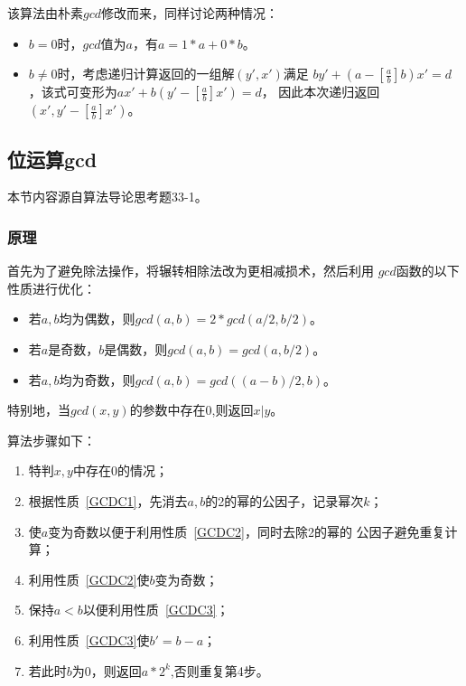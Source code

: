 该算法由朴素$gcd$修改而来，同样讨论两种情况：

\begin{itemize}
	\item $b=0$时，$gcd$值为$a$，有$a=1*a+0*b$。
	\item $b\neq 0$时，考虑递归计算返回的一组解$(y',x')$满足
	      $by'+(a-[\frac{a}{b}]b)x'=d$，该式可变形为$ax'+b(y'-[\frac{a}{b}]x')=d$，
	      因此本次递归返回$(x',y'-[\frac{a}{b}]x')$。
\end{itemize}

\subsection{位运算gcd}

本节内容源自算法导论\cite{ITA3}思考题33-1。

\subsubsection{原理}

首先为了避免除法操作，将辗转相除法改为更相减损术，然后利用
$gcd$函数的以下性质进行优化：

\begin{itemize}
	\item \begin{property}\label{GCDC1}
		      若$a,b$均为偶数，则$gcd(a,b)=2*gcd(a/2,b/2)$。
	      \end{property}
	\item \begin{property}\label{GCDC2}
		      若$a$是奇数，$b$是偶数，则$gcd(a,b)=gcd(a,b/2)$。
	      \end{property}
	\item \begin{property}\label{GCDC3}
		      若$a,b$均为奇数，则$gcd(a,b)=gcd((a-b)/2,b)$。
	      \end{property}
\end{itemize}

特别地，当$gcd(x,y)$的参数中存在0,则返回$x|y$。

算法步骤如下：
\begin{enumerate}
	\item 特判$x,y$中存在0的情况；
	\item 根据性质~\ref{GCDC1}，先消去$a,b$的2的幂的公因子，记录幂次$k$；
	\item 使$a$变为奇数以便于利用性质~\ref{GCDC2}，同时去除2的幂的
	      公因子避免重复计算；
	\item 利用性质~\ref{GCDC2}使$b$变为奇数；
	\item 保持$a<b$以便利用性质~\ref{GCDC3}；
	\item 利用性质~\ref{GCDC3}使$b'=b-a$；
	\item 若此时$b$为0，则返回$a*2^k$,否则重复第4步。
\end{enumerate}

